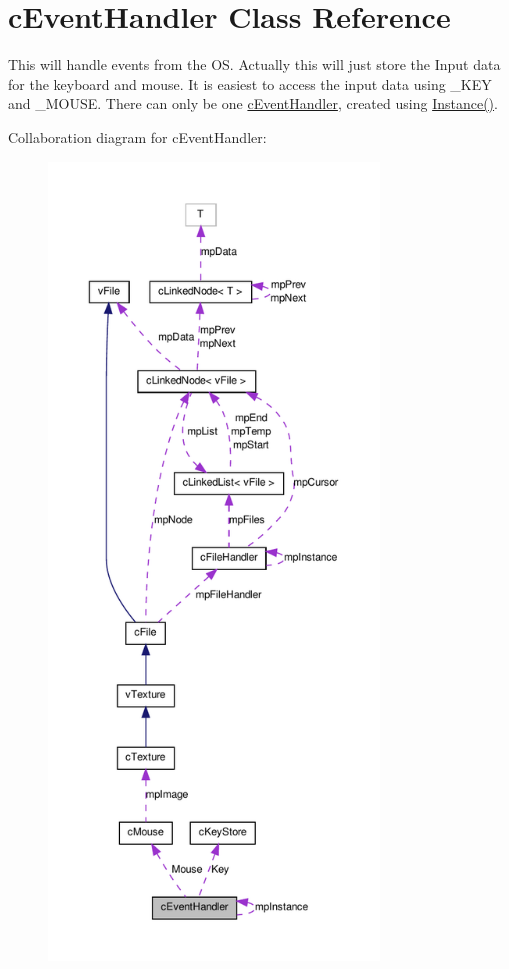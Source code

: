 \hypertarget{classc_event_handler}{
\section{cEventHandler Class Reference}
\label{classc_event_handler}
}


This will handle events from the OS. Actually this will just store the Input data for the keyboard and mouse. It is easiest to access the input data using \_\-KEY and \_\-MOUSE. There can only be one \hyperlink{classc_event_handler}{cEventHandler}, created using \hyperlink{classc_event_handler_a5a3b7fc02b0cadeb1f79ecb27aa580cb}{Instance()}.  




Collaboration diagram for cEventHandler:
\nopagebreak
\begin{figure}[H]
\begin{center}
\leavevmode
\includegraphics[height=600pt]{classc_event_handler__coll__graph}
\end{center}
\end{figure}
